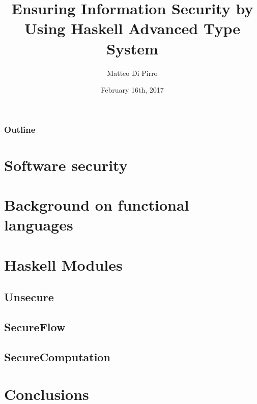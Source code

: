 \documentclass{beamer}
\title{Ensuring Information Security \newline by Using Haskell Advanced Type System}
\subtitle{}
\author{Matteo Di Pirro}
\date{February 16th, 2017}
\institute{University of Padova}
\begin{document}
\newcommand{\turnOffNumbers}{true} %

\begin{frame}[noframenumbering]
\titlepage
\end{frame}

\let\turnOffNumbers\empty
\begin{frame}
	\frametitle{Outline}
	\tableofcontents
\end{frame}

\section{Software security}


\section{Background on functional languages}





\section{Haskell Modules}

	\subsection{Unsecure}
	
	\subsection{SecureFlow}
	
	
	\subsection{SecureComputation}
	
	
\section{Conclusions}

	
\appendix
\makethanks
\renewcommand{\turnOffNumbers}{true} %
\end{document}
